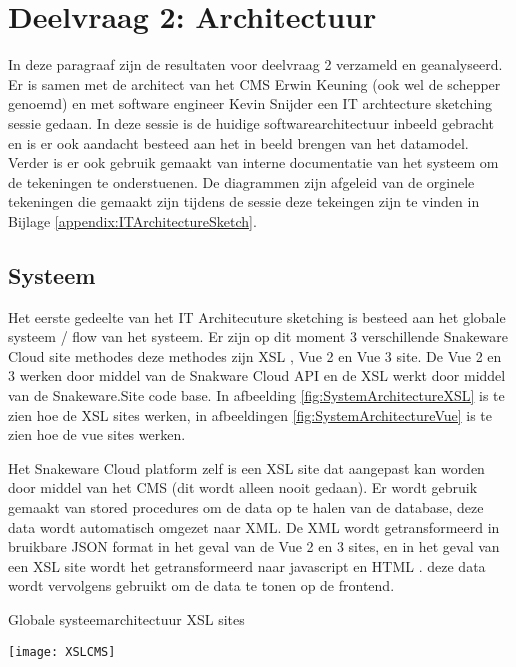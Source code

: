\section{Deelvraag 2: Architectuur}
In deze paragraaf zijn de resultaten voor deelvraag 2 \textit{\SubquestionTwo} verzameld en geanalyseerd.
Er is samen met de architect van het CMS Erwin Keuning (ook wel de schepper genoemd) en met software engineer Kevin Snijder een IT archtecture sketching sessie gedaan.
In deze sessie is de huidige softwarearchitectuur inbeeld gebracht en is er ook aandacht besteed aan het in beeld brengen van het datamodel.
Verder is er ook gebruik gemaakt van interne documentatie van het systeem om de tekeningen te onderstuenen.
De diagrammen zijn afgeleid van de orginele tekeningen die gemaakt zijn tijdens de sessie deze tekeingen zijn te vinden in Bijlage \ref{appendix:ITArchitectureSketch}.

\subsection{Systeem}
Het eerste gedeelte van het IT Architecuture sketching is besteed aan het globale systeem / flow van het systeem.
Er zijn op dit moment 3 verschillende Snakeware Cloud site methodes deze methodes zijn XSL \Parencite{XSL}, Vue 2 en Vue 3 \Parencite{Vue} site.
De Vue 2 en 3 werken door middel van de Snakware Cloud API en de XSL werkt door middel van de Snakeware.Site code base.
In afbeelding \ref{fig:SystemArchitectureXSL} is te zien hoe de XSL sites werken, in afbeeldingen \ref{fig:SystemArchitectureVue} is te zien hoe de vue sites werken.

\whitespace
Het Snakeware Cloud platform zelf is een XSL site dat aangepast kan worden door middel van het CMS (dit wordt alleen nooit gedaan).
Er wordt gebruik gemaakt van stored procedures om de data op te halen van de database, deze data wordt automatisch omgezet naar XML.
De XML wordt getransformeerd in bruikbare JSON format \Parencite{JSON} in het geval van de Vue 2 en 3 sites, en in het geval van een XSL site wordt het getransformeerd naar javascript en HTML \Parencite{HTML}.
deze data wordt vervolgens gebruikt om de data te tonen op de frontend.

\whitespace
\begin{graphic}
	\captionsetup{type=figure}
	\caption{Globale systeemarchitectuur XSL sites}
	\texttt{[image: XSLCMS]}
	\label{fig:SystemArchitectureXSL}
\end{graphic}


